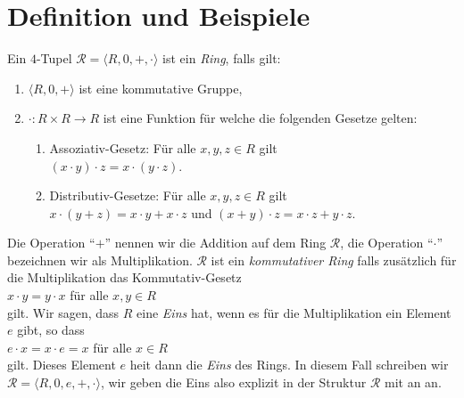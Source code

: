 \section{Definition und Beispiele}
\begin{Definition}[Ring]
Ein $4$-Tupel $\mathcal{R} = \langle R, 0, +, \cdot \rangle$ ist ein \emph{\color{blue}Ring}, falls gilt:
\begin{enumerate}
\item $\langle R, 0, + \rangle$ ist eine kommutative Gruppe,
\item $\cdot: R \times R \rightarrow R$ ist eine Funktion f\"{u}r welche die folgenden Gesetze gelten:
      \begin{enumerate}
      \item Assoziativ-Gesetz:  F\"{u}r alle $x, y,z \in R$ gilt
            \\[0.2cm]
            \hspace*{1.3cm}
            $(x \cdot y) \cdot z = x \cdot (y \cdot z)$.
      \item Distributiv-Gesetze: F\"{u}r alle $x, y,z \in R$ gilt
            \\[0.2cm]
            \hspace*{1.3cm} 
            $x \cdot (y + z) = x \cdot y + x \cdot z$ \quad und \quad
            $(x + y) \cdot z = x \cdot z + y \cdot z$.
      \end{enumerate}
\end{enumerate}
Die Operation ``$+$'' nennen wir die Addition auf dem Ring $\mathcal{R}$, die Operation ``$\cdot$'' bezeichnen 
wir als Multiplikation.
$\mathcal{R}$ ist ein {\color{blue}\emph{kommutativer Ring}} falls zus\"{a}tzlich f\"{u}r die Multiplikation
das Kommutativ-Gesetz
\\[0.2cm]
\hspace*{1.3cm}
$x \cdot y = y \cdot x$ \quad f\"{u}r alle $x,y \in R$
\\[0.2cm]
gilt.  Wir sagen, dass $R$ eine {\color{blue}\emph{Eins}} hat, wenn es f\"{u}r die Multiplikation ein Element $e$ gibt, so dass
\\[0.2cm]
\hspace*{1.3cm}
$e \cdot x = x \cdot e = x$ \quad f\"{u}r alle $x \in R$
\\[0.2cm]
gilt.  Dieses Element $e$ hei\3t dann die \emph{Eins} des Rings.  In diesem Fall schreiben wir
$\mathcal{R} = \langle R, 0, e, +, \cdot \rangle$, wir geben die Eins also explizit in der Struktur $\mathcal{R}$ mit an
an.
\eox
\end{Definition}

